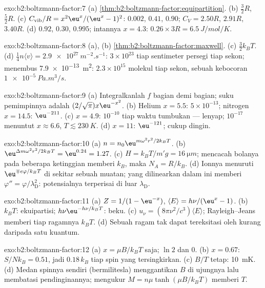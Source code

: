 \begin{solution}{exo:b2:boltzmann-factor:7}
(a) \cref{thm:b2:boltzmann-factor:equipartition}. (b) $\tfrac32R$,
$\tfrac52R$. (c) $C_{\text{vib}}/R = x^2\eu^x/(\eu^x - 1)^2$: $0.002$, $0.41$, $0.90$;
$C_V = 2.50R$, $2.91R$, $3.40R$. (d) $0.92$, $0.30$, $0.995$; intannya $x = 4.3$:
$0.26 \times 3R = \qty{6.5}{J/mol/K}$.
\end{solution}

\begin{solution}{exo:b2:boltzmann-factor:8}
(a), (b) \cref{thm:b2:boltzmann-factor:maxwell}. (c) $\tfrac32k_BT$. (d)
$\tfrac14n\langle v\rangle = \qty{2.9e27}{m^{-2}.s^{-1}}$: $3 \times 10^{23}$ tiap sentimeter
persegi tiap sekon; menembus \qty{7.9e-13}{m^2}: $2.3 \times 10^{15}$
molekul tiap sekon, sebuah kebocoran $\qty{1e-5}{Pa.m^3/s}$.
\end{solution}

\begin{solution}{exo:b2:boltzmann-factor:9}
(a) Integralkanlah $f$ bagian demi bagian; suku pemimpinnya adalah $(2/\sqrt\pi)x\eu^{-x^2}$. (b)
Helium $x = 5.5$: $5 \times 10^{-13}$; nitrogen $x = 14.5$: $\eu^{-211}$. (c) $x =
4.9$: $10^{-10}$ tiap waktu tumbukan --- lenyap; $10^{-17}$ menuntut $x \approx 6.6$,
$T \lesssim \qty{230}{K}$. (d) $x = 11$: $\eu^{-121}$; cukup dingin.
\end{solution}

\begin{solution}{exo:b2:boltzmann-factor:10}
(a) $n = n_0\eu^{m\omega^2r^2/2k_BT}$. (b) $\eu^{\Delta m\omega^2r^2/2k_BT} = \eu^{0.24} =
1.27$. (c) $H = k_BT/m'g = \qty{16}{\micro m}$; mencacah bolanya pada
beberapa ketinggian memberi $k_B$, maka $N_A = R/k_B$. (d) Ionnya menuruti
$\eu^{\mp e\varphi/k_BT}$ di sekitar sebuah muatan; yang dilinearkan dalam 
ini memberi $\varphi'' = \varphi/\lambda_{\text{D}}^2$: potensialnya terperisai
di luar $\lambda_{\text{D}}$.
\end{solution}

\begin{solution}{exo:b2:boltzmann-factor:11}
(a) $Z = 1/(1 - \eu^{-x})$, $\langle E\rangle = h\nu/(\eu^x - 1)$. (b) $k_BT$:
ekuipartisi; $h\nu\eu^{-h\nu/k_BT}$: beku. (c) $u_\nu = (8\pi\nu^2/c^3)\langle E
\rangle$; Rayleigh--Jeans memberi tiap ragamnya $k_BT$. (d) Sebuah ragam tak dapat
tereksitasi oleh kurang daripada satu kuantum.
\end{solution}

\begin{solution}{exo:b2:boltzmann-factor:12}
(a) $x = \mu B/k_BT$ saja; $\ln 2$ dan $0$. (b) $x = 0.67$: $S/Nk_B = 0.51$, jadi
$0.18\,k_B$ tiap spin yang tersingkirkan. (c) $B/T$ tetap: \qty{10}{mK}. (d) Medan
spinnya sendiri (bermilitesla) menggantikan $B$ di ujungnya lalu membatasi pendinginannya;
mengukur $M = n\mu\tanh(\mu B/k_BT)$ memberi $T$.
\end{solution}


